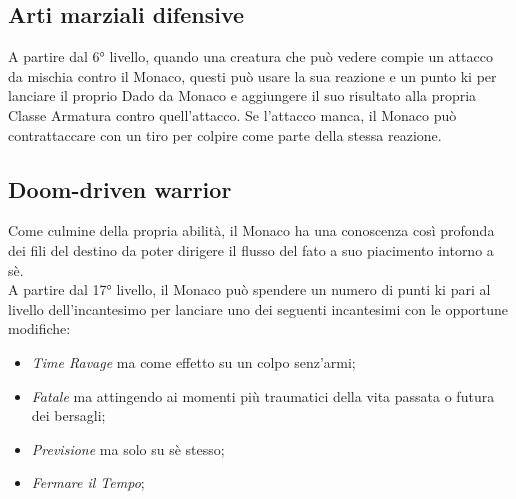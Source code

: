 \documentclass[letterpaper,twocolumn,openany,nodeprecatedcode]{dndbook}
\begin{document}
\subsection{Arti marziali difensive}
A partire dal 6° livello, quando una creatura che può vedere compie un attacco da mischia contro il Monaco, questi può usare la sua reazione e un punto ki per lanciare il proprio Dado da Monaco e aggiungere il suo risultato alla propria Classe Armatura contro quell'attacco. Se l'attacco manca, il Monaco può contrattaccare con un tiro per colpire come parte della stessa reazione.

\subsection{}


\subsection{Doom-driven warrior}
Come culmine della propria abilità, il Monaco ha una conoscenza così profonda dei fili del destino da poter dirigere il flusso del fato a suo piacimento intorno a sè.\\
A partire dal 17° livello, il Monaco può spendere un numero di punti ki pari al livello dell'incantesimo per lanciare uno dei seguenti incantesimi con le opportune modifiche:\begin{itemize}
    \item \textit{Time Ravage} ma come effetto su un colpo senz'armi;\\
    \item \textit{Fatale} ma attingendo ai momenti più traumatici della vita passata o futura dei bersagli;\\
    \item \textit{Previsione} ma solo su sè stesso;\\
    \item \textit{Fermare il Tempo};
\end{itemize}
\end{document}
